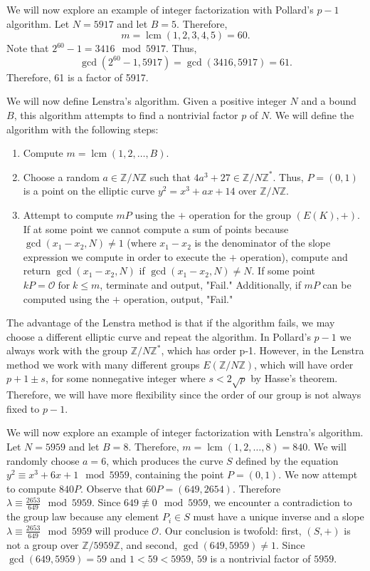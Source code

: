 \documentclass{article}
\DeclareMathOperator{\for}{for}
\DeclareMathOperator{\lcm}{lcm}
\begin{document}
\indent We will now explore an example of integer factorization with Pollard's $p-1$ algorithm. Let $N=5917$ and let $B=5$. Therefore, 
$$m=\lcm (1,2,3,4,5)=60.$$
Note that $2^{60}-1=3416 \mod 5917$. Thus,
$$\gcd (2^{60}-1, 5917)=\gcd (3416, 5917)=61.$$
Therefore, 61 is a factor of 5917.

\indent We will now define Lenstra's algorithm. Given a positive integer $N$ and a bound $B$, this algorithm attempts to find a nontrivial factor $p$ of $N$. We will define the algorithm with the following steps:
\begin{enumerate}
\item Compute $m=\lcm(1,2,\dotso,B)$. 
\item Choose a random $a \in \mathbb{Z}/N\mathbb{Z}$ such that $4a^3+27 \in \mathbb{Z}/N\mathbb{Z}^*$. Thus, $P=(0,1)$ is a point on the elliptic curve $y^2=x^3+ax+14$ over $\mathbb{Z}/N\mathbb{Z}$.
\item Attempt to compute $mP$ using the $+$ operation for the group $(E(K),+)$. If at some point we cannot compute a sum of points because $\gcd(x_1-x_2,N) \neq 1$ (where $x_1-x_2$ is the denominator of the slope expression we compute in order to execute the $+$ operation), compute and return $\gcd(x_1-x_2,N)$ if $\gcd(x_1-x_2,N) \neq N$. If some point $kP=\mathcal{O} \for k \leq m$, terminate and output, "Fail." Additionally, if $mP$ can be computed using the $+$ operation, output, "Fail."
\end{enumerate}

\indent The advantage of the Lenstra method is that if the algorithm fails, we may choose a different elliptic curve and repeat the algorithm. In Pollard's $p-1$ we always work with the group $\mathbb{Z}/N\mathbb{Z}^*$, which has order p-1. However, in the Lenstra method we work with many different groups $E(\mathbb{Z}/N\mathbb{Z})$, which will have order $p+1\pm s$, for some nonnegative integer where $s<2\sqrt{p}$ by Hasse's theorem. Therefore, we will have more flexibility since the order of our group is not always fixed to $p-1$.

\indent We will now explore an example of integer factorization with Lenstra's algorithm. Let $N=5959$ and let $B=8$. Therefore, $m=\lcm(1,2,\dotso,8)=840$. We will randomly choose $a=6$, which produces the curve $S$ defined by the equation $y^2 \equiv x^3+6x+1 \mod 5959$, containing the point $P=(0,1)$. We now attempt to compute $840P$. Observe that $60P=(649,2654)$. Therefore $\lambda\equiv\frac{2653}{649} \mod 5959$. Since $649 \not\equiv 0 \mod 5959$, we encounter a contradiction to the group law because any element $P_i \in S$ must have a unique inverse and a slope $\lambda\equiv\frac{2653}{649} \mod 5959$ will produce $\mathcal{O}$. Our conclusion is twofold: first, $(S,+)$ is not a group over $\mathbb{Z}/5959\mathbb{Z}$, and second, $\gcd(649,5959)\neq1$. Since $\gcd(649,5959)=59$ and $1<59<5959$, $59$ is a nontrivial factor of $5959$.
\end{document}
